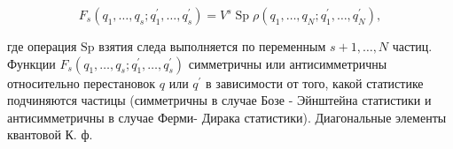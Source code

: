 \documentclass[10pt]{article}
\begin{document}
\[

F_{s}\left(q_{1}, \ldots, q_{s} ; q_{1}^{\prime}, \ldots, q_{s}^{\prime}\right)=V^{s} \operatorname{Sp} \rho\left(q_{1}, \ldots, q_{N} ; q_{1}^{\prime}, \ldots, q_{N}^{\prime}\right),

\]



где операция $\mathrm{Sp}$ взятия следа выполняется по переменным $s+1, \ldots, N$ частиц. Функции $F_{s}\left(q_{1}, \ldots, q_{s} ; q_{1}^{\prime}, \ldots, q_{s}^{\prime}\right)$ симметричны или антисимметричны относительно перестановок $q$ или $q^{\prime}$ в зависимости от того, какой статистике подчиняются частицы (симметричны в случае Бозе - Эйнштейна статистики и антисимметричны в случае Ферми- Дирака статистики). Диагональные элементы квантовой К. ф.
\end{document}
